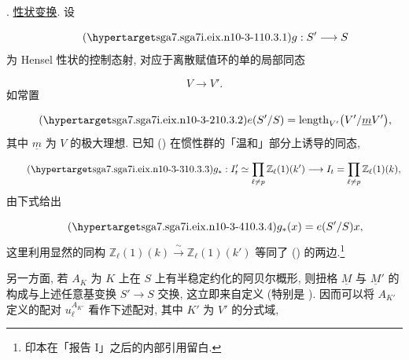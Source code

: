 

\medskip
\noindent
{}. \underline{性状变换}. 设

\begin{equation}\tag{\SGARefTarget{sga7.sga7i.eix.n10-3-1}{10.3.1}}
g:S'\longrightarrow S
\end{equation}
为 Hensel 性状的控制态射, 对应于离散赋值环的单的局部同态

\begin{equation*}
V\longrightarrow V'.
\end{equation*}
如常置

\begin{equation}\tag{\SGARefTarget{sga7.sga7i.eix.n10-3-2}{10.3.2}}
e(S'/S)=\operatorname{length}_{V'}\bigl(V'/\underline mV'\bigr),
\end{equation}
其中 $\underline m$ 为 $V$ 的极大理想. 已知 () 在惯性群的「温和」部分上诱导的同态,

\begin{equation}\tag{\SGARefTarget{sga7.sga7i.eix.n10-3-3}{10.3.3}}
g_*:I'_t\simeq\prod_{\ell\ne p}\mathbb Z_\ell(1)(k')
 \longrightarrow
 I_t=\prod_{\ell\ne p}\mathbb Z_\ell(1)(k),
\end{equation}
由下式给出

\begin{equation}\tag{\SGARefTarget{sga7.sga7i.eix.n10-3-4}{10.3.4}}
g_*(x)=e(S'/S)x,
\end{equation}
这里利用显然的同构 $\mathbb Z_\ell(1)(k)\xrightarrow{\ \sim\ }\mathbb Z_\ell(1)(k')$ 等同了 () 的两边.\footnote{印本在「报告 I」之后的内部引用留白.}

另一方面, 若 $A_K$ 为 $K$ 上在 $S$ 上有半稳定约化的阿贝尔概形, 则扭格 $\underline M$ 与 $\underline M'$ 的构成与上述任意基变换 $S'\longrightarrow S$ 交换, 这立即来自定义 (特别是 ). 因而可以将 $A_{K'}$ 定义的配对 $u_\ell^{A_{K'}}$ 看作下述配对, 其中 $K'$ 为 $V'$ 的分式域,

